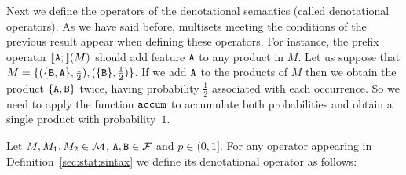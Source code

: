 Next we define the operators of the denotational semantics (called denotational operators). As we have said before, multisets
meeting the conditions of the previous result appear when
defining these operators. For instance, the prefix operator
$[\![{\mathtt{A}};]\!](M)$ should add feature ${\mathtt{A}}$ to any product in $M$. Let us
suppose that
$M=\{
   (\{{\mathtt{B}},{\mathtt{A}}\},\frac{1}{2}),
   (\{{\mathtt{B}}\},\frac{1}{2})\}$.
If we add ${\mathtt{A}}$ to the products of $M$ then we obtain the product
$\{{\mathtt{A}},{\mathtt{B}}\}$ twice, having probability $\frac{1}{2}$ associated with each occurrence. So we
need to apply the function $\mathtt{accum}$ to accumulate both probabilities
and obtain a single product with probability~$1$.


\bdfn\label{def:semantic:operators}
  Let $M,M_1,M_2\in{\cal M}$, ${\mathtt{A}},{\mathtt{B}}\in{\cal F}$ and $p\in(0,1]$. For any operator appearing in
  Definition~\ref{sec:stat:sintax} we define its denotational operator
  as follows:
